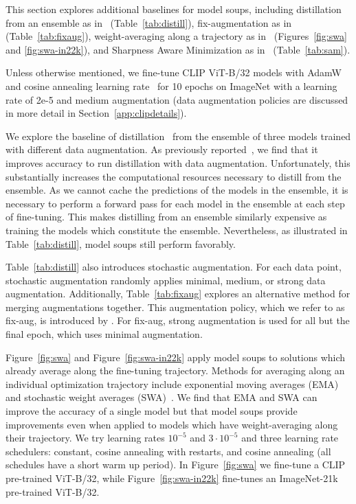 \documentclass[nohyperref]{article}
\theoremstyle{plain}
\theoremstyle{definition}
\theoremstyle{remark}
\begin{document}
    This section explores additional baselines for model soups, including
    distillation from an ensemble as in~\citet{hinton2014dark} (Table~\ref{tab:distill}),
    fix-augmentation as in~\citet{fixaug} (Table~\ref{tab:fixaug}),
    weight-averaging along a trajectory as in~\citet{szegedy2016rethinking, izmailov2018averaging} (Figures~\ref{fig:swa} and \ref{fig:swa-in22k}),
    and Sharpness Aware Minimization as in~\citet{foret2021sharpnessaware} (Table~\ref{tab:sam}).
    
    Unless otherwise mentioned, we fine-tune CLIP ViT-B/32 models
    with AdamW~\cite{loshchilov2018decoupled} and cosine annealing learning rate~\cite{loshchilov2016sgdr}
    for 10 epochs on ImageNet with a learning rate of 2e-5 and medium augmentation (data
    augmentation policies are discussed in more detail in 
    Section~\ref{app:clipdetails}).
    
    We explore the baseline of distillation~\cite{hinton2014dark,hinton2015distilling}
    from the ensemble of three models trained with different
    data augmentation.
    As previously reported~\cite{bagherinezhad2018label,beyer2021knowledge}, we find
    that it improves accuracy to run distillation with data augmentation.
    Unfortunately, this substantially increases the computational resources necessary to distill from the ensemble.
    As we cannot cache the predictions
    of the models in the ensemble, it is necessary to perform a forward pass for each model in the ensemble at each step of fine-tuning.
    This makes distilling from an ensemble
    similarly expensive as training the models which
    constitute the ensemble.
    Nevertheless, as illustrated in Table~\ref{tab:distill},
    model soups still perform favorably.
    
    Table~\ref{tab:distill} also introduces stochastic augmentation.
    For each data point, stochastic augmentation randomly applies minimal, medium, or
    strong data augmentation.
    Additionally, Table~\ref{tab:fixaug} explores an alternative method
    for merging augmentations together.
    This augmentation policy, which we refer to as
    fix-aug, is introduced by \citet{fixaug}.
    For fix-aug, strong augmentation is used for all but
    the final epoch, which uses minimal augmentation.
    
    Figure~\ref{fig:swa} and Figure~\ref{fig:swa-in22k} apply model soups to solutions
    which already average along the fine-tuning trajectory.
    Methods for averaging along an individual optimization trajectory
    include exponential moving averages
    (EMA)~\cite{szegedy2016rethinking} and stochastic
    weight averages (SWA)~\cite{izmailov2018averaging}.
    We find that EMA and SWA can improve the accuracy of a single model but
    that model soups provide improvements even when applied to models which have weight-averaging along their trajectory.
    We try learning rates $10^{-5}$ and $3 \cdot 10^{-5}$ and three learning
    rate schedulers: constant, cosine annealing with restarts, and cosine annealing (all schedules have a short warm up period).
    In Figure~\ref{fig:swa} we fine-tune a CLIP pre-trained ViT-B/32, while Figure~\ref{fig:swa-in22k}
    fine-tunes an ImageNet-21k pre-trained ViT-B/32.
    
\end{document}
